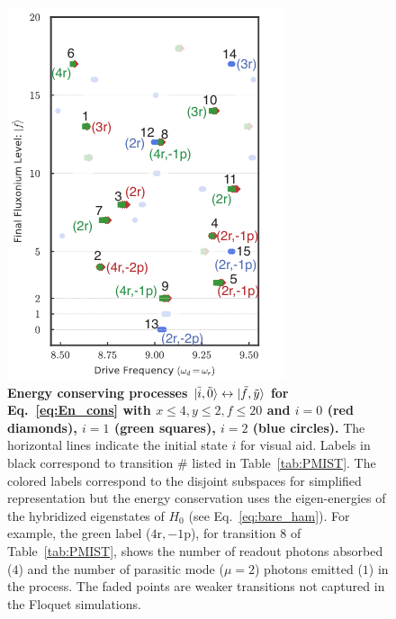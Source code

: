 \documentclass[%
reprint,
superscriptaddress,
 amsmath,amssymb,
 aps,
 prx,
longbibliography,
floatfix,
]{revtex4-2}
\begin{document}
\begin{figure}[t]
    \centering
    \includegraphics[width=\linewidth]{Figures/Trans_.pdf}
    \caption{{\bf Energy conserving processes $\ket{\tilde{i},\tilde{0}}\leftrightarrow\ket{\tilde{f},\tilde{y}}$ for Eq.~\ref{eq:En_cons} with $x\le 4, y\le 2, f\le 20$ and $i=0$ (red diamonds), $i=1$ (green squares), $i=2$ (blue circles).} The horizontal lines indicate the initial state $i$ for visual aid. Labels in black correspond to transition $\#$ listed in Table~\ref{tab:PMIST}. The colored labels correspond to the disjoint subspaces for simplified representation but the energy conservation uses the eigen-energies of the hybridized eigenstates of $H_{0}$ (see Eq.~\ref{eq:bare_ham}). For example, the green label ($4 \mathrm{r},-1 \mathrm{p}$), for transition $8$ of Table~\ref{tab:PMIST}, shows the number of readout photons absorbed ($4$) and the number of parasitic mode ($\mu=2$) photons emitted ($1$) in the process. The faded points are weaker transitions not captured in the Floquet simulations. 
}
    \label{fig:trans_prof}
\end{figure}
\end{document}
